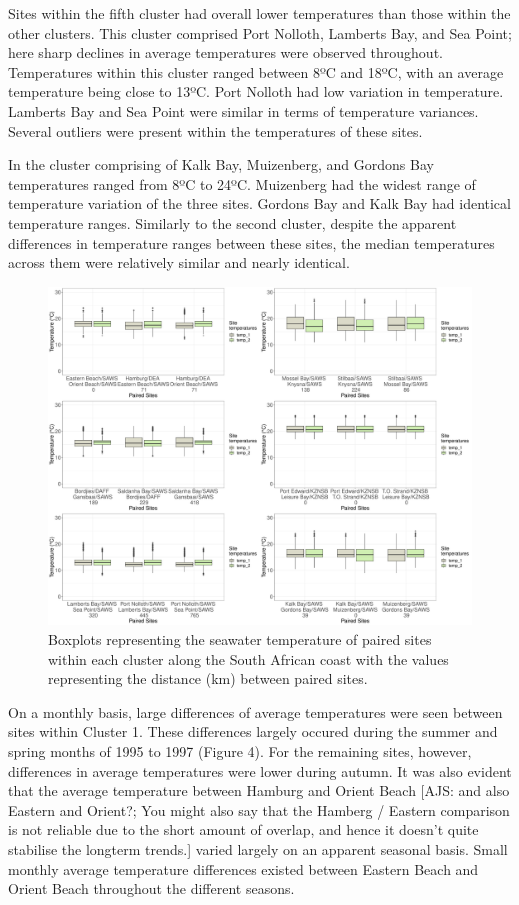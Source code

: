 \documentclass[12pt,a4paper,]{article}
\begin{document}
Sites within the fifth cluster had overall lower temperatures than those
within the other clusters. This cluster comprised Port Nolloth, Lamberts
Bay, and Sea Point; here sharp declines in average temperatures were
observed throughout. Temperatures within this cluster ranged between 8ºC
and 18ºC, with an average temperature being close to 13ºC. Port Nolloth
had low variation in temperature. Lamberts Bay and Sea Point were
similar in terms of temperature variances. Several outliers were present
within the temperatures of these sites.

In the cluster comprising of Kalk Bay, Muizenberg, and Gordons Bay
temperatures ranged from 8ºC to 24ºC. Muizenberg had the widest range of
temperature variation of the three sites. Gordons Bay and Kalk Bay had
identical temperature ranges. Similarly to the second cluster, despite
the apparent differences in temperature ranges between these sites, the
median temperatures across them were relatively similar and nearly
identical.

\begin{figure}
\centering
\includegraphics{../figures/combined_plot.pdf}
\caption{Boxplots representing the seawater temperature of paired sites
within each cluster along the South African coast with the values
representing the distance (km) between paired sites.}
\end{figure}

On a monthly basis, large differences of average temperatures were seen
between sites within Cluster 1. These differences largely occured during
the summer and spring months of 1995 to 1997 (Figure 4). For the
remaining sites, however, differences in average temperatures were lower
during autumn. It was also evident that the average temperature between
Hamburg and Orient Beach {[}AJS: and also Eastern and Orient?; You might
also say that the Hamberg / Eastern comparison is not reliable due to
the short amount of overlap, and hence it doesn't quite stabilise the
longterm trends.{]} varied largely on an apparent seasonal basis. Small
monthly average temperature differences existed between Eastern Beach
and Orient Beach throughout the different seasons.
\end{document}
